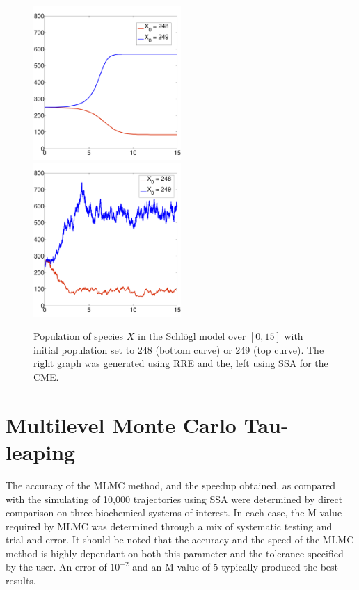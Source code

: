 \documentclass[ugrad,lot,lof,openright,11pt,oneside,onehalfspace]{RUthesis}
\begin{document}
			\begin{figure}[H]
			\centerline{
				\includegraphics[width=0.5\textwidth]{figures/Schlogl_comp_rre.pdf}
				\includegraphics[width=0.5\textwidth]{figures/Schlogl_comp_ssa.pdf}
				}
			\captionsetup{width=0.8\textwidth}
			\caption[Resulting populations in the Schl\"{o}gl model with varying initial conditions]{Population of species $X$ in the Schl\"{o}gl model over $[0,15]$ with initial population set to 248 (bottom curve) or 249 (top curve). The right graph was generated using RRE and the, left using SSA for the CME.}
			\label{schlogl_comparison}
			\end{figure}

	\section{Multilevel Monte Carlo Tau-leaping}

		The accuracy of the MLMC method, and the speedup obtained, as compared with the simulating of 10,000 trajectories using SSA were determined by direct comparison on three biochemical systems of interest. In each case, the M-value required by MLMC was determined through a mix of systematic testing and trial-and-error. It should be noted that the accuracy and the speed of the MLMC method is highly dependant on both this parameter and the tolerance specified by the user. An error of $10^{-2}$ and an M-value of 5 typically produced the best results.
\end{document}
